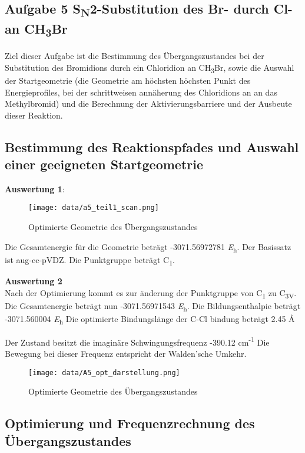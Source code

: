 \documentclass[12pt]{article}
\begin{document}
\begin{onehalfspace}
\section{Aufgabe 5 S\textsubscript{N}2-Substitution des Br- durch Cl- an CH\textsubscript{3}Br}

Ziel dieser Aufgabe ist die Bestimmung des Übergangszustandes bei der
Substitution des Bromidions durch ein Chloridion an CH\textsubscript{3}Br,
sowie die Auswahl der Startgeometrie (die Geometrie am höchsten höchsten Punkt
des Energieprofiles, bei der schrittweisen annäherung des Chloridions an an
das Methylbromid) und die Berechnung der Aktivierungsbarriere und der Ausbeute
dieser Reaktion.


\subsection{Bestimmung des Reaktionspfades und Auswahl einer geeigneten Startgeometrie}



\textbf{Auswertung 1}:

\begin{figure}[!htbp]
\centering
  \texttt{[image: data/a5\_teil1\_scan.png]}%
  \caption{Optimierte Geometrie des Übergangszustandes}
\end{figure}
\noindent

 Die Gesamtenergie für die Geometrie beträgt -3071.56972781 \si{\hartree}.
 Der Basissatz ist aug-cc-pVDZ. Die Punktgruppe beträgt C\textsubscript{1}.

\textbf{Auswertung 2}\\

Nach der Optimierung kommt es zur änderung der Punktgruppe von
C\textsubscript{1} zu C\textsubscript{3V}. Die Gesamtenergie beträgt nun
-3071.56971543 \si{\hartree}. Die Bildungsenthalpie beträgt -3071.560004
\si{\hartree} Die optimierte Bindungslänge der C-Cl bindung beträgt 2.45
\si{\angstrom}

Der Zustand besitzt die imaginäre Schwingungsfrequenz -390.12
cm\textsuperscript{-1} Die Bewegung bei dieser Frequenz entspricht der
Walden'sche Umkehr.

\begin{figure}[!htbp]
\centering
  \texttt{[image: data/A5\_opt\_darstellung.png]}%
  \caption{Optimierte Geometrie des Übergangszustandes}
\end{figure}
\noindent

\subsection{Optimierung und Frequenzrechnung des Übergangszustandes}


\end{onehalfspace}
\end{document}
